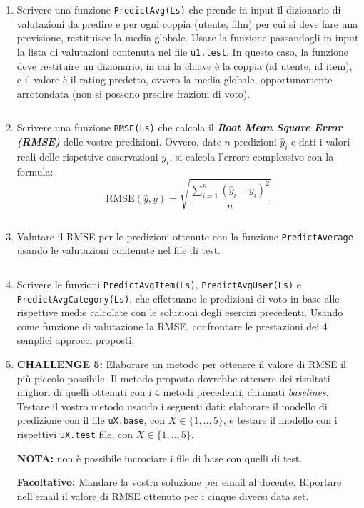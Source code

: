 \documentclass[11pt,a4]{article}
\newcommand{\mybox}[2]{$\quad$\fbox{
\begin{minipage}{#1cm}
\hfill\vspace{#2cm}
\end{minipage}
}}
\begin{document}
\begin{enumerate}
\item Scrivere una funzione {\tt PredictAvg(Ls)} che prende in input il dizionario di valutazioni da predire
e per ogni coppia (utente, film) per cui si deve fare una previsione, restituisce la media globale.
Usare la funzione passandogli in input la lista di valutazioni contenuta nel file {\tt u1.test}.
In questo caso, la funzione deve restituire un dizionario, in cui la chiave è la coppia (id utente, id item), e il
valore è il rating predetto, ovvero la media globale, opportunamente arrotondata (non si possono predire frazioni di voto).

\mybox{15}{3}

\item Scrivere una funzione {\tt RMSE(Ls)} che calcola il {\bf {\it Root Mean Square Error (RMSE)}} delle vostre predizioni.
Ovvero, date $n$ predizioni $\hat{y}_i$ e dati i valori reali delle rispettive osservazioni $y_i$, si calcola l'errore complessivo con la formula:
$$
	\mbox{RMSE}(\hat{y}, y) = \sqrt{\frac{\sum_{i=1}^n (\hat{y}_i - y_i)^2}{n}}
$$

\mybox{15}{3}

\item Valutare il RMSE per le predizioni ottenute con la funzione {\tt PredictAverage} usando le valutazioni contenute nel file di test.

\mybox{15}{3}

\item Scrivere le funzioni {\tt PredictAvgItem(Ls)}, {\tt PredictAvgUser(Ls)} e {\tt PredictAvgCategory(Ls)}, che effettuano
le predizioni di voto in base alle rispettive medie calcolate con le soluzioni degli esercizi precedenti.
Usando come funzione di valutazione la RMSE, confrontare le prestazioni dei 4 semplici approcci proposti.

\item {\bf CHALLENGE 5:} Elaborare un metodo per ottenere il valore di RMSE il più piccolo possibile. Il metodo proposto
dovrebbe ottenere dei risultati migliori di quelli ottenuti con i 4 metodi precedenti, chiamati {\it baselines}.
Testare il vostro metodo usando i seguenti dati: elaborare il modello di predizione con il file {\tt uX.base}, con $X \in \{1,..,5\}$,
e testare il modello con i rispettivi {\tt uX.test} file, con $X \in \{1,..,5\}$. 

{\bf NOTA:} non è possibile incrociare i file di base con quelli di test.

{\bf Facoltativo:} Mandare la vostra soluzione per email al docente. Riportare nell'email il valore di RMSE ottenuto per i cinque diversi data set.


\end{enumerate}
\end{document}
